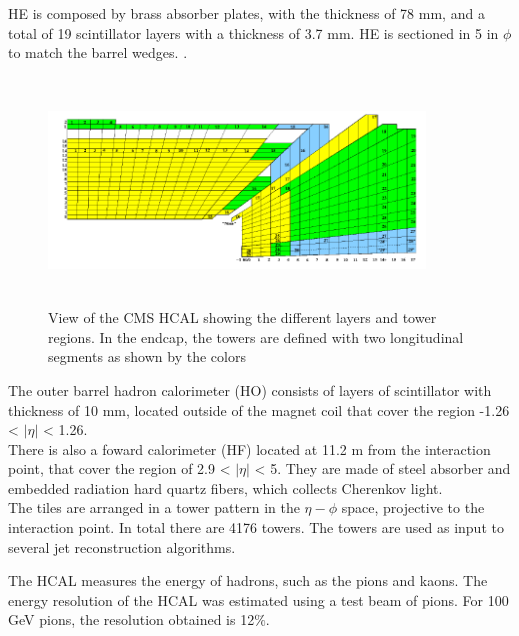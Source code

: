 HE is composed by brass absorber plates, with the thickness of 78 mm, and a total of 19 scintillator layers with a thickness of 3.7 mm. HE is sectioned in 5 in $\phi$ to match the barrel wedges.
. %
\\
\begin{figure}[!htbp]
	\centering
	\includegraphics[width=10cm,height=6cm]{Chapter2/hcal.png}
	\caption{View of the CMS HCAL showing the different layers and tower regions. In the endcap, the towers are defined with two longitudinal segments as shown by the colors\cite{cms-manual}}\label{hcal}
\end{figure}
The outer barrel hadron calorimeter (HO) consists of layers of scintillator with thickness of 10 mm, located outside of the
magnet coil that cover the region -1.26 < $|\eta|$ < 1.26.\\
There is also a foward calorimeter (HF) located at 11.2 m from the interaction point, that cover the region of 2.9 < $|\eta|$ < 5. They are made of
steel absorber and embedded radiation hard quartz fibers, which collects 
Cherenkov light\cite{cms-manual}.%
\\
 
The tiles are arranged in a tower pattern in the $\eta-\phi$ space, projective to the interaction point. In total there
are 4176 towers. The towers are used as input to several jet reconstruction algorithms.

The HCAL measures the energy of hadrons, such as the pions and kaons. 
The energy resolution of the HCAL was estimated using a test beam of pions. For 100 GeV pions, the resolution obtained is 12$\%$.

